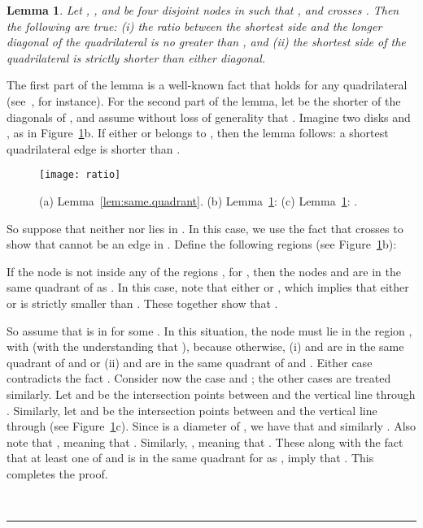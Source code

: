 \pdfoutput=1  \documentclass[11pt]{article}
\newtheorem{lemma}{Lemma}
\newcommand{\qed}{\rule{0.5em}{1.5ex}}
\newcommand{\fqed}{{\hfill~\qed}}
\newenvironment{proof}{{\noindent \bf Proof.}}
                      {{\hfill \fqed} \vspace{1em}}
\begin{document}
\begin{lemma}
Let , ,  and  be four disjoint nodes in  such that
, and
 crosses . Then the following are true: (i) the ratio between the
shortest side and the longer diagonal of the quadrilateral  is
no greater than , and (ii) the
shortest side of the quadrilateral  is strictly shorter
than either diagonal.
\label{lem:quad}
\end{lemma}
\begin{proof}
The first part of the lemma is a well-known fact that holds for
any quadrilateral (see~\cite{Quad51}, for instance).
For the second part of the lemma, let  be the shorter of the
diagonals of , and assume without loss of generality
that .
Imagine two disks  and ,
as in Figure~\ref{fig:ratio}b. If either  or  belongs to
,
then the lemma follows: a shortest quadrilateral edge is shorter
than .

\begin{figure}[htbp]
\centering
\texttt{[image: ratio]}
\caption{(a) Lemma~\ref{lem:same.quadrant}. (b) Lemma~\ref{lem:quad}:  (c) Lemma~\ref{lem:quad}: .}
\label{fig:ratio}
\end{figure}


So suppose that neither  nor  lies in . In
this case, we use the fact that  crosses  to show that
 cannot be an edge in .
Define the following regions (see Figure~\ref{fig:ratio}b):

If the node  is not inside any of the regions , for , then
the nodes  and  are in the same quadrant of  as . In this case, note that
either  or , which implies that either
 or  is strictly smaller than . These together show that
.

So assume that  is in  for some . In this situation,
the node  must lie in the region , with  (with the
understanding that ),
because otherwise, (i)  and  are in the same quadrant of  and
 or (ii)  and  are in the same quadrant of  and
. Either case contradicts the fact .
Consider now the case  and ; the other cases are treated similarly.
Let  and  be the intersection points between  and the
vertical line through . Similarly, let  and  be the
intersection points between  and the vertical line through 
(see Figure~\ref{fig:ratio}c).
Since  is a diameter of , we have that  and similarly
. Also note that ,
meaning that . Similarly, ,
meaning that . These along with the fact that at least one of  and
 is in the same quadrant for  as , imply that
. This completes the proof.
\end{proof}
\end{document}
